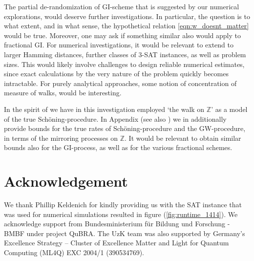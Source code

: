\documentclass[a4paper,aps,floatfix]{revtex4}
\begin{document}
The partial de-randomization of GI-scheme that is suggested by our numerical explorations, would deserve further investigations.    
In particular, the question is to what extent, and in what sense,  the hypothetical relation \eqref{eqn:w_doesnt_matter} would be true. Moreover, one may ask if something similar also would apply to fractional GI. For numerical investigations, it would be relevant to extend to larger Hamming distances, further classes of $3$-SAT  instances, as well as problem sizes. This would likely involve challenges to design reliable numerical estimates, since exact calculations by the very nature of the problem quickly becomes intractable. For purely analytical approaches, some notion of concentration of measure of walks, would be interesting. 


In the spirit of \cite{Schoening99, SchoeningToranBook} we have in this investigation employed  `the walk on $\mathbb{Z}$' as a model of the true Sch\"oning-procedure. In Appendix (see also \cite{SwissPhDThesis}) we in additionally provide bounds for the true rates of Sch\"oning-procedure and the GW-procedure, in terms of the mirroring processes on $\mathbb{Z}$. It would be relevant to obtain similar bounds also for the GI-process, as well as for the various fractional schemes.



\section{Acknowledgement}

We thank Phillip Keldenich for kindly providing us with the SAT instance that was used for numerical simulations resulted in figure (\ref{fig:runtime_1414}). 
We acknowledge support from Bundesministerium für Bildung und Forschung - BMBF under project QuBRA.
The UzK team was also supported by Germany’s Excellence Strategy – Cluster of Excellence Matter and Light for Quantum Computing (ML4Q) EXC 2004/1 (390534769).

\end{document}
